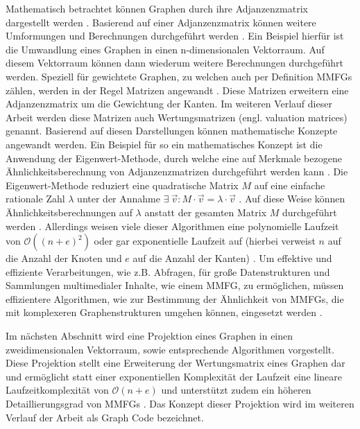 Mathematisch betrachtet können Graphen durch ihre Adjanzenzmatrix dargestellt werden \cite{fast-effec-retr-large-collec}.
Basierend auf einer Adjanzenzmatrix können weitere Umformungen und Berechnungen durchgeführt werden \cite{fast-effec-retr-large-collec}. Ein Beispiel hierfür ist die Umwandlung eines Graphen in einen n-dimensionalen Vektorraum. Auf diesem Vektorraum können dann wiederum weitere Berechnungen durchgeführt werden.
Speziell für gewichtete Graphen, zu welchen auch per Definition MMFGs zählen, werden in der Regel Matrizen angewandt \cite{fast-effec-retr-large-collec}.
Diese Matrizen erweitern eine Adjanzenzmatrix um die Gewichtung der Kanten.
Im weiteren Verlauf dieser Arbeit werden diese Matrizen auch Wertungsmatrizen (engl. valuation matrices) genannt.
Basierend auf diesen Darstellungen können mathematische Konzepte angewandt werden.
Ein Beispiel für so ein mathematisches Konzept ist die Anwendung der Eigenwert-Methode, durch welche eine auf Merkmale bezogene Ähnlichkeitsberechnung von Adjanzenzmatrizen durchgeführt werden kann \cite{fast-effec-retr-large-collec}.
Die Eigenwert-Methode reduziert eine quadratische Matrix $M$ auf eine einfache rationale Zahl $\lambda$ unter der Annahme $\exists~\Vec{v}: M \cdot \Vec{v} = \lambda \cdot \Vec{v}$ \cite{fast-effec-retr-large-collec}.
Auf diese Weise können Ähnlichkeitsberechnungen auf $\lambda$ anstatt der gesamten Matrix $M$ durchgeführt werden \cite{fast-effec-retr-large-collec}.
Allerdings weisen viele dieser Algorithmen eine polynomielle Laufzeit von $\mathcal{O}((n + e)^2)$ oder gar exponentielle Laufzeit auf (hierbei verweist $n$ auf die Anzahl der Knoten und $e$ auf die Anzahl der Kanten) \cite{fast-effec-retr-large-collec}.
Um effektive und effiziente Verarbeitungen, wie z.B. Abfragen, für große Datenstrukturen und Sammlungen multimedialer Inhalte, wie einem MMFG, zu ermöglichen, müssen effizientere Algorithmen, wie zur Bestimmung der Ähnlichkeit von MMFGs, die mit komplexeren Graphenstrukturen umgehen können, eingesetzt werden \cite{fast-effec-retr-large-collec}.

Im nächsten Abschnitt wird eine Projektion eines Graphen in einen zweidimensionalen Vektorraum, sowie entsprechende Algorithmen vorgestellt.
Diese Projektion stellt eine Erweiterung der Wertungsmatrix eines Graphen dar und ermöglicht statt einer exponentiellen Komplexität der Laufzeit eine lineare Laufzeitkomplexität von $\mathcal{O}(n+e)$ und unterstützt zudem ein höheren Detaillierungsgrad von MMFGs \cite{fast-effec-retr-large-collec}.
Das Konzept dieser Projektion wird im weiteren Verlauf der Arbeit als Graph Code \cite{gc-2d-proj-mmfg} bezeichnet.


